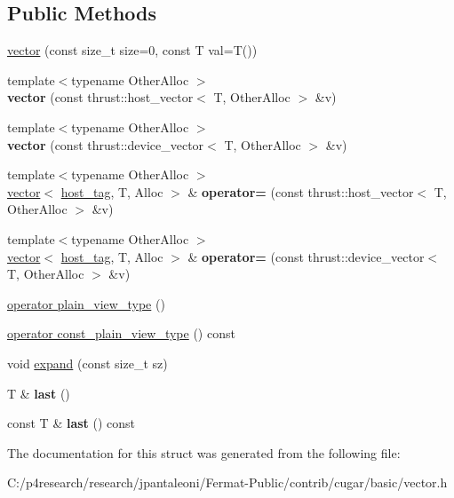 \subsection*{Public Methods}
\begin{DoxyCompactItemize}
\item 
\hyperlink{group___basic_ga8407403c92ae9effc1472b1bf47bd3f6}{vector} (const size\+\_\+t size=0, const T val=T())
\item 
{\footnotesize template$<$typename Other\+Alloc $>$ }\\{\bfseries vector} (const thrust\+::host\+\_\+vector$<$ T, Other\+Alloc $>$ \&v)
\item 
{\footnotesize template$<$typename Other\+Alloc $>$ }\\{\bfseries vector} (const thrust\+::device\+\_\+vector$<$ T, Other\+Alloc $>$ \&v)
\item 
{\footnotesize template$<$typename Other\+Alloc $>$ }\\\hyperlink{structcugar_1_1vector}{vector}$<$ \hyperlink{structcugar_1_1host__tag}{host\+\_\+tag}, T, Alloc $>$ \& {\bfseries operator=} (const thrust\+::host\+\_\+vector$<$ T, Other\+Alloc $>$ \&v)
\item 
{\footnotesize template$<$typename Other\+Alloc $>$ }\\\hyperlink{structcugar_1_1vector}{vector}$<$ \hyperlink{structcugar_1_1host__tag}{host\+\_\+tag}, T, Alloc $>$ \& {\bfseries operator=} (const thrust\+::device\+\_\+vector$<$ T, Other\+Alloc $>$ \&v)
\item 
\hyperlink{group___basic_gae0a95fb635c4cf188b029a0dd5ca670e}{operator plain\+\_\+view\+\_\+type} ()
\item 
\hyperlink{group___basic_ga338f7b6f3de7b1dc36a125fd4704cff8}{operator const\+\_\+plain\+\_\+view\+\_\+type} () const
\item 
void \hyperlink{group___basic_ga8974bf847d3e9ef8bbf2e6318c001087}{expand} (const size\+\_\+t sz)
\item 
T \& {\bfseries last} ()
\item 
const T \& {\bfseries last} () const
\end{DoxyCompactItemize}


The documentation for this struct was generated from the following file\+:\begin{DoxyCompactItemize}
\item 
C\+:/p4research/research/jpantaleoni/\+Fermat-\/\+Public/contrib/cugar/basic/vector.\+h\end{DoxyCompactItemize}
